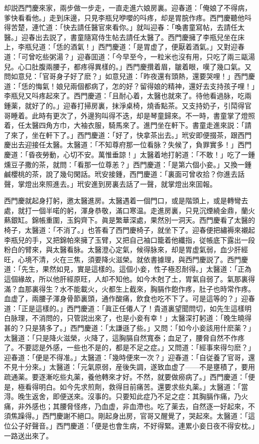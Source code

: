 却説西門慶來家，兩步做一步走，一直走進六娘房裏。迎春道：「俺娘了不得病，爹快看看他。」走到床邊，只見李瓶兒咿嚶的呌疼，却是胃脘作疼。西門慶聽他呌得苦楚，連忙道：「快去請任醫官來看你。」就叫迎春：「喚書童寫帖，去請任太醫。」迎春出去説了，書童隨寫侍生帖去請任太醫了。西門慶擁了李瓶兒坐在床上，李瓶兒道：「恁的酒氣！」西門慶道：「是胃虚了，便厭着酒氣。」又對迎春道：「可曾吃些粥湯？」迎春囬道：「今早至今，一粒米也沒有用，只吃了兩三甌湯兒。心口肚腹兩腰子，都疼得異樣的。」西門慶攢着眉，皺着眼，嘆了幾口氣。又問如意兒：「官哥身子好了麽？」如意兒道：「昨夜還有頭熱，還要哭哩！」西門慶道：「恁的悔氣！娘兒兩個都病了，怎的好？留得娘的精神，還好去支持孩子哩！」李瓶兒又呌疼起來了。西門慶道：「且耐心着，太醫也就來了。待他看過脉，吃兩鍾薬，就好了的。」迎春打掃房裏，抹淨桌椅，燒香點茶。又支持奶子，引鬦得官哥睡着。此時有更次了，外邊狗叫得不迭，却是琴童歸來。不一時，書童掌了燈照着，任太醫四角方巾，大袖衣服，騎馬來了。進門坐在軒下。書童走進來説：「請了來了，坐在軒下了。」西門慶道：「好了，快拿茶出去。」玳安即便掇茶，跟西門慶出去迎接任太醫。太醫道：「不知尊府那一位看脉？失候了，負罪實多！」西門慶道：「昏夜勞動，心切不安。萬惟垂諒！」太醫着地打躬道：「不敢！」吃了一鍾燻豆子撒的茶，就問：「看那一位尊恙？」西門慶道：「是第六個小妾。」又換一鍾鹹櫻桃的茶，說了幾句閑話。玳安接鍾，西門慶道：「裏面可曾收拾？你進去話聲，掌燈出來照進去。」玳安進到房裏去話了一聲，就掌燈出來囬報。

西門慶就起身打躬，邀太醫進房。太醫遇着一個門口，或是階頭上，或是轉彎去處，就打一個半喏的躬，渾身恭敬，滿口寒温。走進房裏，只見沉煙繞金鼎，蘭火爇銀缸。錦帳重圍，玉鈎齊下。眞是繁華深處，果然別一洞天。西門慶看了太醫的椅子，太醫道：「不消了。」也答看了西門慶椅子，就坐下了。迎春便把繡褥來襯起李瓶兒的手，又把錦帕來擁了玉臂，又把自己袖口籠着他纖指，従帳底下露出一段粉白的臂來，與太醫看脉。太醫澄心定氣，候得脉來，却是胃虚氣弱，血少肝經旺，心境不清，火在三焦，須要降火滋榮。就依書據理，與西門慶説了。西門慶道：「先生，果然如見，實是這樣的。這個小妾，性子極忍耐得。」太醫道：「正為這個緣故，所以他肝經原旺，人却不知他。如今木尅了土，胃氣自弱了。氣那裏得滿？血那裏得生？水不能載火，火都生上截來，胸膈作飽作疼，肚子也時常作疼。血虚了，兩腰子渾身骨節裏頭，通作酸痛，飲食也吃不下了。可是這等的？」迎春道：「正是這樣的。」西門慶道：「眞正任僊人了！貴道裏望聞問切，如先生這樣明白脉理，不消問的，只管説出來了，也是小妾有幸！」太醫深打躬道：「晚生曉得甚的？只是猜多了。」西門慶道：「太謙遜了些。」又問：「如今小妾該用什麽薬？」太醫道：「只是降火滋榮，火降了，這胸膈自然寬泰；血足了，腰脅自然不作疼了。不要認是外感，一些也不是的，都是不足之症。」又問道：「經事來得匀麽？」迎春道：「便是不得准。」太醫道：「幾時便來一次？」迎春道：「自従養了官哥，還不見十分來。」太醫道：「元氣原弱，産後失調，遂致血虚了——不是壅積了，要用疏通薬。要逐漸吃些丸薬，養他轉來才好。不然，就要做癆病了。」西門慶道：「便是，極看得明白。如今先求煎劑，救得目前痛苦。還要求些丸薬。」太醫道：「當淂。晚生返舍，即便送來。沒事的。只要知此症乃不足之症：其胸膈作痛，乃火痛，非外感也；其腰脅怪疼，乃血虚，非血滯也。吃了薬去，自然逐一好起來，不須焦躁得。」西門慶謝不絕口。剛起身出房，官哥又醒覺了，哭起來。太醫道：「這位公子好聲音。」西門慶道：「便是也會生病，不好得緊。連累小妾日夜不得安枕。」一路送出來了。

